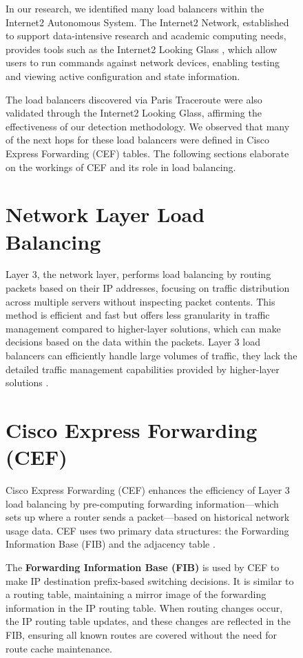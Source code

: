 \documentclass[12pt]{cwru_thesis}
\begin{document}
\begin{figure}[h!]
In our research, we identified many load balancers within the Internet2 Autonomous System. The Internet2 Network, established to support data-intensive research and academic computing needs, provides tools such as the Internet2 Looking Glass \cite{Internet2_looking_glass}, which allow users to run commands against network devices, enabling testing and viewing active configuration and state information.

The load balancers discovered via Paris Traceroute were also validated through the Internet2 Looking Glass, affirming the effectiveness of our detection methodology. We observed that many of the next hops for these load balancers were defined in Cisco Express Forwarding (CEF) tables. The following sections elaborate on the workings of CEF and its role in load balancing.

\section{Network Layer Load Balancing}

Layer 3, the network layer, performs load balancing by routing packets based on their IP addresses, focusing on traffic distribution across multiple servers without inspecting packet contents. This method is efficient and fast but offers less granularity in traffic management compared to higher-layer solutions, which can make decisions based on the data within the packets. Layer 3 load balancers can efficiently handle large volumes of traffic, they lack the detailed traffic management capabilities provided by higher-layer solutions \cite{zhang}.

\section{Cisco Express Forwarding (CEF)}

Cisco Express Forwarding (CEF) enhances the efficiency of Layer 3 load balancing by pre-computing forwarding information---which sets up where a router sends a packet---based on historical network usage data. CEF uses two primary data structures: the Forwarding Information Base (FIB) and the adjacency table \cite{cisco2017cef}.

The \textbf{Forwarding Information Base (FIB)} is used by CEF to make IP destination prefix-based switching decisions. It is similar to a routing table, maintaining a mirror image of the forwarding information in the IP routing table. When routing changes occur, the IP routing table updates, and these changes are reflected in the FIB, ensuring all known routes are covered without the need for route cache maintenance.


\end{figure}
\end{document}

